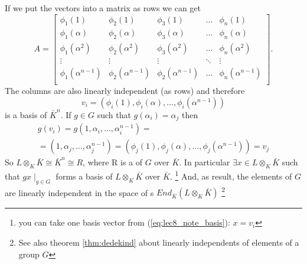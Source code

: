 {  If we put the vectors into a matrix as rows we can get
  \[
  A =
  \begin{bmatrix}
    \phi_1(1) & \phi_2(1) & \phi_3(1) & \dots &
    \phi_n(1) \\
    \phi_1(\alpha) & \phi_2(\alpha) & \phi_3(\alpha) & \dots &
    \phi_n(\alpha) \\
    \phi_1(\alpha^2) & \phi_2(\alpha^2) & \phi_3(\alpha^2) & \dots &
    \phi_n(\alpha^2) \\
    \vdots & \vdots & \vdots & \ddots & \vdots \\
    \phi_1(\alpha^{n-1}) & \phi_2(\alpha^{n-1}) & \phi_2(\alpha^{n-1})
    & \dots &
    \phi_n(\alpha^{n-1}) \\
  \end{bmatrix}.
  \]
  The columns are also linearly independent (as rows) and therefore
  \begin{equation}
  v_i = \left(\phi_i(1), \phi_i(\alpha), \dots,
  \phi_i(\alpha^{n-1})\right)
  \label{eq:lec8_note_basis}
  \end{equation}
  is a basis of $\bar{K}^n$. If $g \in G$ such that
  $g(\alpha_i) = \alpha_j$ then
  \begin{eqnarray}
    g(v_i) = g\left(
    1,\alpha_i, \dots, \alpha_i^{n-1}
    \right) =
    \nonumber \\
    =
    \left(
    1,\alpha_j, \dots, \alpha_j^{n-1}
    \right)
    =
    \left(\phi_j(1), \phi_j(\alpha), \dots,
    \phi_j(\alpha^{n-1})\right) = v_j
    \nonumber
  \end{eqnarray}
}
So $L \otimes_K \bar{K} \cong
\bar{K}^n \cong R$, where R is a 
of $G$ over $\bar{K}$. 
In particular $\exists x \in L \otimes_K \bar{K}$
such that $gx \mid_{g \in G}$
forms a basis of $L \otimes_K \bar{K}$ over $\bar{K}$.
\footnote{
  you can take one basis vector from (\ref{eq:lec8_note_basis}): $x = v_i$ 
} And, as result, the elements of $G$ are linearly independent in the space of
s
$End_{\bar{K}}\left(L \otimes_K \bar{K}\right)$
\footnote{
  See also theorem \ref{thm:dedekind} about linearly independents of
  elements of a group $G$
}

